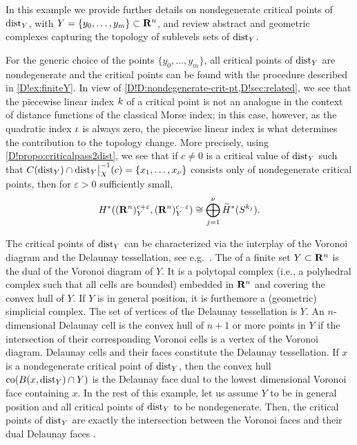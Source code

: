 \begin{example}
\label{D!example:points2}
  In this example we provide further details on nondegenerate critical points of $\operatorname{dist}_Y$, with $Y=\{y_0,\ldots ,y_m\}\subset \mathbf{R}^n$, and review abstract and geometric complexes capturing the topology of sublevels sets of $\operatorname{dist}_Y$.

  For the generic choice of the points $\{y_0, \ldots, y_m\}$, all critical points of $\operatorname{dist}_Y$ are nondegenerate and the critical points can be found with the procedure described in \cref{D!ex:finiteY}. 
  In view of \cref{D!D:nondegenerate-crit-pt,D!sec:related}, we see that the piecewise linear index $k$ of a critical point is not an analogue in the context of distance functions of the classical Morse index; in this case, however, as the quadratic index $\iota$ is always zero, the piecewise linear index is what determines the contribution to the topology change.
  More precisely, using \cref{D!propo:criticalpass2dist}, we see that if $c\neq 0$ is a critical value of $\operatorname{dist}_Y$ such that 
  $C(\operatorname{dist}_Y)\cap \mathord{\operatorname{dist}}_Y\big|_X^{-1}(c)=\{x_1, \ldots, x_\nu\}$ consists only of nondegenerate critical points, then for $\varepsilon>0$ sufficiently small, 
  \[
    H^*((\mathbf{R}^n)^{ c+\varepsilon}_Y, (\mathbf{R}^n)^{c-\varepsilon}_Y)\cong \bigoplus_{j=1}^\nu\widetilde{H}^*(S^{k_j}).
  \]

  The critical points of $\operatorname{dist}_Y$ can be characterized via the interplay of the Voronoi diagram and the Delaunay tessellation, see e.g.\ \cite{buchin2008recursive}. 
  The  of a finite set $Y\subset \mathbf{R}^n$ is the dual of the Voronoi diagram of $Y$. It is a polytopal complex (i.e., a polyhedral complex such that all cells are bounded) embedded in $\mathbf{R}^n$ and covering the convex hull of $Y$. If $Y$ is in general position, it is furthemore a (geometric) simplicial complex. The set of vertices of the Delaunay tessellation is $Y$. An $n$-dimensional Delaunay cell is the convex hull of $n+1$ or more points in $Y$ if the intersection of their corresponding Voronoi cells is a vertex of the Voronoi diagram. Delaunay cells and their faces constitute the Delaunay tessellation. If $x$ is a nondegenerate critical point of $\operatorname{dist}_Y$, then the convex hull $\mathrm{co}(B(x,\operatorname{dist}_Y)\cap Y)$ is the Delaunay face dual to the lowest dimensional Voronoi face containing $x$. In the rest of this example, let us assume $Y$ to be in general position and all critical points of $\operatorname{dist}_Y$ to be nondegenerate. Then, the critical points of $\operatorname{dist}_Y$ are exactly the intersection between the Voronoi faces and their dual Delaunay faces \cite{buchin2008recursive}.


\end{example}
